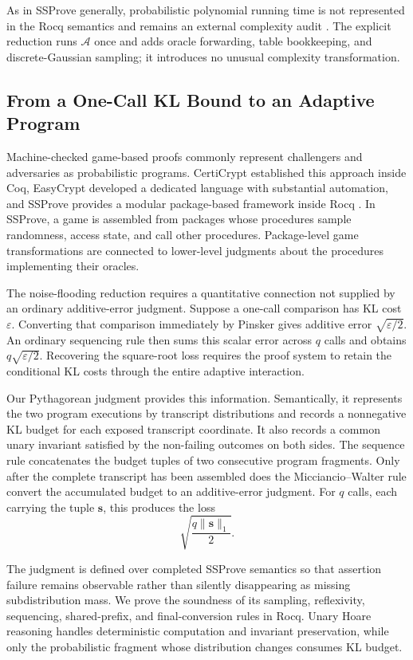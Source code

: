 As in SSProve generally, probabilistic polynomial running time is not represented in the Rocq semantics and remains an external complexity audit \cite{ssprove}. The explicit reduction runs $\mathcal{A}$ once and adds oracle forwarding, table bookkeeping, and discrete-Gaussian sampling; it introduces no unusual complexity transformation.

\subsection{From a One-Call KL Bound to an Adaptive Program}
\label{sec:intro-local-to-adaptive}

Machine-checked game-based proofs commonly represent challengers and adversaries as probabilistic programs. CertiCrypt established this approach inside Coq, EasyCrypt developed a dedicated language with substantial automation, and SSProve provides a modular package-based framework inside Rocq \cite{certicrypt,easycrypt,ssprove}. In SSProve, a game is assembled from packages whose procedures sample randomness, access state, and call other procedures. Package-level game transformations are connected to lower-level judgments about the procedures implementing their oracles.

The noise-flooding reduction requires a quantitative connection not supplied by an ordinary additive-error judgment. Suppose a one-call comparison has KL cost $\varepsilon$. Converting that comparison immediately by Pinsker gives additive error $\sqrt{\varepsilon/2}$. An ordinary sequencing rule then sums this scalar error across $q$ calls and obtains $q\sqrt{\varepsilon/2}$. Recovering the square-root loss requires the proof system to retain the conditional KL costs through the entire adaptive interaction.

Our Pythagorean judgment provides this information. Semantically, it represents the two program executions by transcript distributions and records a nonnegative KL budget for each exposed transcript coordinate. It also records a common unary invariant satisfied by the non-failing outcomes on both sides. The sequence rule concatenates the budget tuples of two consecutive program fragments. Only after the complete transcript has been assembled does the Micciancio--Walter rule convert the accumulated budget to an additive-error judgment. For $q$ calls, each carrying the tuple $\mathbf{s}$, this produces the loss
\[
\sqrt{\frac{q\lVert\mathbf{s}\rVert_{1}}{2}}.
\]

The judgment is defined over completed SSProve semantics so that assertion failure remains observable rather than silently disappearing as missing subdistribution mass. We prove the soundness of its sampling, reflexivity, sequencing, shared-prefix, and final-conversion rules in Rocq. Unary Hoare reasoning handles deterministic computation and invariant preservation, while only the probabilistic fragment whose distribution changes consumes KL budget.

